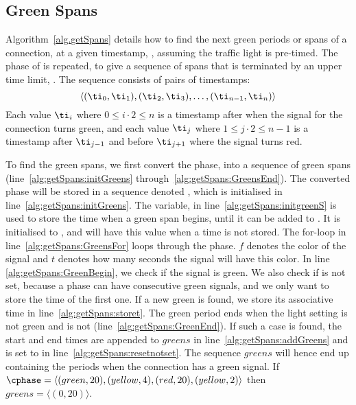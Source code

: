 \subsection{Green Spans}\label{sec:greenSpans}
Algorithm~\ref{alg.getSpans} details how to find the next green periods or spans of a connection, \con at a given timestamp, \ti, assuming the traffic light is pre-timed.
The phase of \con is repeated, to give a sequence of spans that is terminated by an upper time limit, \tmax.
The sequence consists of pairs of timestamps:
\[\langle(\ti_0, \ti_1), (\ti_2, \ti_3), \dots, (\ti_{n-1}, \ti_n)\rangle\]
Each value $\ti_i$ where $0\leq i\cdot 2\leq n$ is a timestamp after \ti when the signal for the connection turns green, and each value $\ti_j$ where $1\leq j\cdot 2\leq n-1$ is a timestamp after $\ti_{j-1}$ and before $\ti_{j+1}$ where the signal turns red.

To find the green spans, we first convert the phase, \phase into a sequence of green spans (line~\ref{alg:getSpans:initGreens} through~\ref{alg:getSpans:GreensEnd}).
The converted phase will be stored in a sequence denoted \greens, which is initialised in line~\ref{alg:getSpans:initGreens}.
The variable, \greenStart in line~\ref{alg:getSpans:initgreenS} is used to store the time when a green span begins, until it can be added to \greens. 
It is initialised to \notset, and will have this value when a time is not stored.
The for-loop in line~\ref{alg:getSpans:GreensFor} loops through the phase.
$f$ denotes the color of the signal and $t$ denotes how many seconds the signal will have this color.
In line \ref{alg:getSpans:GreenBegin}, we check if the signal is green. 
We also check if \greenStart is not set, because a phase can have consecutive green signals, and we only want to store the time of the first one.
If a new green is found, we store its associative time in line~\ref{alg:getSpans:storet}.
The green period ends when the light setting is not green and \greenStart is not \notset (line~\ref{alg:getSpans:GreenEnd}).
If such a case is found, the start and end times are appended to $greens$ in line~\ref{alg:getSpans:addGreens} and \greenStart is set to \notset in line~\ref{alg:getSpans:resetnotset}.
The sequence $greens$ will hence end up containing the periods when the connection has a green signal.
If $\cphase=\langle (green, 20), (yellow, 4), (red, 20), (yellow, 2)\rangle$ then $greens=\langle (0,20)\rangle$.

